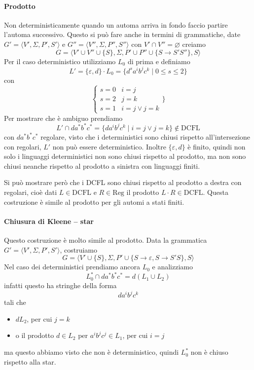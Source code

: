 \documentclass[12pt]{report}
\theoremstyle{definition}
\begin{document}
\paragraph{Prodotto} Non deterministicamente quando un automa arriva in fondo faccio partire l'automa successivo.
Questo si può fare anche in termini di grammatiche, date $G' = \langle V', \Sigma, P', S' \rangle$ e $G'' = \langle V'', \Sigma, P'', S'' \rangle$ con $V' \cap V'' = \varnothing$ creiamo
$$ G = \langle V' \cup V'' \cup \{ S \}, \Sigma, P' \cup P'' \cup \{ S \rightarrow S' S'' \}, S \rangle $$
Per il caso deterministico utilizziamo $L_0$ di prima %
e definiamo
$$ L' = \{ \varepsilon, d \} \cdot L_0 = \{ d^s a^i b^j c^k \mid 0 \leq s \leq 2 \} $$
con 
$$\begin{cases} s = 0 & i = j \\ s = 2 & j = k \\ s = 1 & i = j \vee j = k \end{cases}\} $$
Per mostrare che è ambiguo prendiamo
$$ L' \cap d a^* b^* c^* = \{ d a^i b^j c^k \mid i = j \vee j = k \} \not \in \text{DCFL}$$
con $d a^* b^* c^*$ regolare, visto che i deterministici sono chiusi rispetto all'intersezione con regolari, $L'$ non può essere deterministico.
Inoltre $\{\varepsilon, d\}$ è finito, quindi non solo i linguaggi deterministici non sono chiusi rispetto al prodotto, ma non sono chiusi neanche rispetto al prodotto a sinistra con linguaggi finiti.

Si può mostrare però che i DCFL sono chiusi rispetto al prodotto a destra con regolari, cioè dati $L \in \text{DCFL}$ e $R \in \text{Reg}$ il prodotto $L \cdot R \in \text{DCFL}$.
Questa costruzione è simile al prodotto per gli automi a stati finiti.

\paragraph{Chiusura di Kleene -- star} Questo costruzione è molto simile al prodotto. 
Data la grammatica $G' = \langle V', \Sigma, P', S' \rangle$, costruiamo
$$ G = \langle V' \cup \{ S \}, \Sigma, P' \cup \{ S \rightarrow \varepsilon, S \rightarrow S' S \}, S \rangle $$
Nel caso dei deterministici prendiamo ancora $L_0$ e analizziamo
$$ L_0^* \cap d a^* b^* c^* = d (L_1 \cup L_2) $$
infatti questo ha stringhe della forma
$$ da^ib^jc^k $$
tali che
\begin{itemize}
	\item $dL_2$, per cui $j = k$
	\item o il prodotto $d \in L_2$ per $a^i b^j c^j \in L_1$, per cui $i = j$
\end{itemize}
ma questo abbiamo visto che non è deterministico, quindi $L_0^*$ non è chiuso rispetto alla star.
\end{document}
